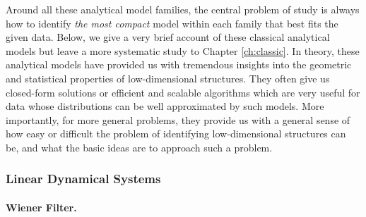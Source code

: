 \documentclass[../../book-main.tex]{subfiles}
\begin{document}
Around all these analytical model families, the central problem of study is always how to identify {\em the most compact} model within each family that best fits the given data. Below, we give a very brief account of these classical analytical models but leave a more systematic study to Chapter \ref{ch:classic}. In theory, these analytical models have provided us with tremendous insights into the geometric and statistical properties of low-dimensional structures. They often give us closed-form solutions or efficient and scalable algorithms which are very useful for data whose distributions can be well approximated by such models. More importantly, for more general problems, they provide us with a general sense of how easy or difficult the problem of identifying low-dimensional structures can be, and what the basic ideas are to approach such a problem.




\subsubsection{Linear Dynamical Systems}
\label{sec:linear-systems}

\paragraph{Wiener Filter.}
\end{document}
